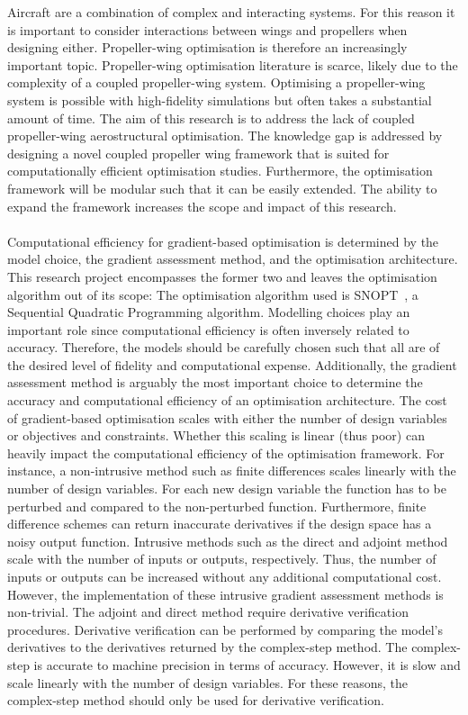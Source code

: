 Aircraft are a combination of complex and interacting systems. For this reason it is important to consider interactions between wings and propellers when designing either. Propeller-wing optimisation is therefore an increasingly important topic. Propeller-wing optimisation literature is scarce, likely due to the complexity of a coupled propeller-wing system. Optimising a propeller-wing system is possible with high-fidelity simulations but often takes a substantial amount of time. The aim of this research is to address the lack of coupled propeller-wing aerostructural optimisation. The knowledge gap is addressed by designing a novel coupled propeller wing framework that is suited for computationally efficient optimisation studies. Furthermore, the optimisation framework will be modular such that it can be easily extended. The ability to expand the framework increases the scope and impact of this research.\\
\\
Computational efficiency for gradient-based optimisation is determined by the model choice, the gradient assessment method, and the optimisation architecture. This research project encompasses the former two and leaves the optimisation algorithm out of its scope: The optimisation algorithm used is SNOPT~\cite{gill2005snopt}, a Sequential Quadratic Programming algorithm. Modelling choices play an important role since computational efficiency is often inversely related to accuracy. Therefore, the models should be carefully chosen such that all are of the desired level of fidelity and computational expense. Additionally, the gradient assessment method is arguably the most important choice to determine the accuracy and computational efficiency of an optimisation architecture. The cost of gradient-based optimisation scales with either the number of design variables or objectives and constraints. Whether this scaling is linear (thus poor) can heavily impact the computational efficiency of the optimisation framework. For instance, a non-intrusive method such as finite differences scales linearly with the number of design variables. For each new design variable the function has to be perturbed and compared to the non-perturbed function. Furthermore, finite difference schemes can return inaccurate derivatives if the design space has a noisy output function. Intrusive methods such as the direct and adjoint method scale with the number of inputs or outputs, respectively. Thus, the number of inputs or outputs can be increased without any additional computational cost. However, the implementation of these intrusive gradient assessment methods is non-trivial. The adjoint and direct method require derivative verification procedures. Derivative verification can be performed by comparing the model's derivatives to the derivatives returned by the complex-step method. The complex-step is accurate to machine precision in terms of accuracy. However, it is slow and scale linearly with the number of design variables. For these reasons, the complex-step method should only be used for derivative verification.\\
